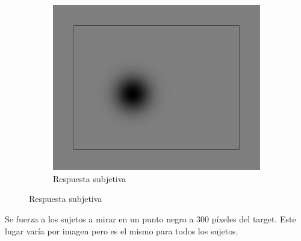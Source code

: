 \documentclass[compress]{beamer}
\begin{document}
\begin{frame}
\begin{figure}[!b]
\begin{subfigure}[b]{0.32\textwidth}
    \end{subfigure}
    \hfill
    \begin{subfigure}[b]{0.32\textwidth}
        \centering
        \includegraphics[width=\linewidth]{images/subjective_response_ahora.jpg} 
        \caption{Respuesta subjetiva} \label{fig:expe-etapa-4}
    \end{subfigure}
\end{figure}

Se fuerza a los sujetos a mirar en un punto negro a 300 píxeles del target. Este lugar varía por imagen pero es el mismo para todos los sujetos.

\end{frame}
\end{document}
